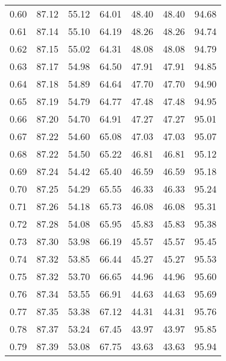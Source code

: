\begin{tabular}{|c|c|c|c|c|c|c|}
      0.60 &     87.12 &     55.12 &      64.01 &   48.40 &      48.40 &         94.68 \\
      0.61 &     87.14 &     55.10 &      64.19 &   48.26 &      48.26 &         94.74 \\
      0.62 &     87.15 &     55.02 &      64.31 &   48.08 &      48.08 &         94.79 \\
      0.63 &     87.17 &     54.98 &      64.50 &   47.91 &      47.91 &         94.85 \\
      0.64 &     87.18 &     54.89 &      64.64 &   47.70 &      47.70 &         94.90 \\
      0.65 &     87.19 &     54.79 &      64.77 &   47.48 &      47.48 &         94.95 \\
      0.66 &     87.20 &     54.70 &      64.91 &   47.27 &      47.27 &         95.01 \\
      0.67 &     87.22 &     54.60 &      65.08 &   47.03 &      47.03 &         95.07 \\
      0.68 &     87.22 &     54.50 &      65.22 &   46.81 &      46.81 &         95.12 \\
      0.69 &     87.24 &     54.42 &      65.40 &   46.59 &      46.59 &         95.18 \\
      0.70 &     87.25 &     54.29 &      65.55 &   46.33 &      46.33 &         95.24 \\
      0.71 &     87.26 &     54.18 &      65.73 &   46.08 &      46.08 &         95.31 \\
      0.72 &     87.28 &     54.08 &      65.95 &   45.83 &      45.83 &         95.38 \\
      0.73 &     87.30 &     53.98 &      66.19 &   45.57 &      45.57 &         95.45 \\
      0.74 &     87.32 &     53.85 &      66.44 &   45.27 &      45.27 &         95.53 \\
      0.75 &     87.32 &     53.70 &      66.65 &   44.96 &      44.96 &         95.60 \\
      0.76 &     87.34 &     53.55 &      66.91 &   44.63 &      44.63 &         95.69 \\
      0.77 &     87.35 &     53.38 &      67.12 &   44.31 &      44.31 &         95.76 \\
      0.78 &     87.37 &     53.24 &      67.45 &   43.97 &      43.97 &         95.85 \\
      0.79 &     87.39 &     53.08 &      67.75 &   43.63 &      43.63 &         95.94 \\

\end{tabular}

